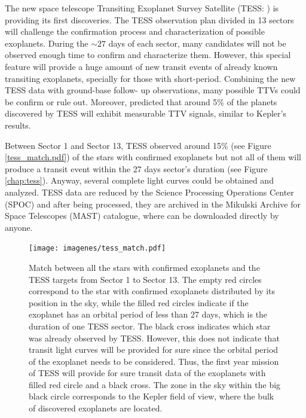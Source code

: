 The new space telescope Transiting Exoplanet Survey Satellite (TESS: \cite{Ricker2014}) is providing its first discoveries. The TESS observation plan divided in 13 sectors will challenge the confirmation process and characterization of possible exoplanets. During the $\sim27$ days of each sector, many candidates will not be observed enough time to confirm and characterize them. However, this special feature will provide a huge amount of new transit events of already known transiting exoplanets, specially for those with short-period. Combining the new TESS data with ground-base follow- up observations, many possible TTVs could be confirm or rule out. Moreover, \cite{Ballard2018} predicted that around 5\% of the planets discovered by TESS will exhibit measurable TTV signals, similar to Kepler’s results.

Between Sector 1 and Sector 13, TESS observed around 15\% (see Figure \ref{tess_match.pdf}) of the stars with confirmed exoplanets but not all of them will produce a transit event within the 27 days sector's duration (see Figure \ref{chap:tess}). Anyway, several complete light curves could be obtained and analyzed. TESS data are reduced by the Science Processing Operations Center (SPOC) and after being processed, they are archived in the Mikulski Archive for Space Telescopes (MAST) catalogue, where can be downloaded directly by anyone. 

\begin{figure}
\centering
\texttt{[image: imagenes/tess\_match.pdf]}
\caption{Match between all the stars with confirmed exoplanets and the TESS targets from Sector 1 to Sector 13. The empty red circles correspond to the star with confirmed exoplanets distributed by its position in the sky, while the filled red circles indicate if the exoplanet has an orbital period of less than 27 days, which is the duration of one TESS sector. The black cross indicates which star was already observed by TESS. However, this does not indicate that transit light curves will be provided for sure since the orbital period of the exoplanet needs to be considered. Thus, the first year mission of TESS will provide for sure transit data of the exoplanets with filled red circle and a black cross. The zone in the sky within the big black circle corresponds to the Kepler field of view, where the bulk of discovered exoplanets are located.}
\label{match_tess}
\end{figure}


